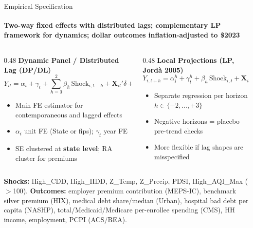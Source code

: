 \documentclass[aspectratio=169,11pt]{beamer}
\newcommand{\emphcolor}[1]{{\color{WarmOrange}\textbf{#1}}}
\newcommand{\tealtext}[1]{{\color{Teal}#1}}
\begin{document}
\begin{frame}[shrink=4]{Empirical Specification}
  \framesubtitle{Two-way fixed effects with distributed lags; complementary LP framework for dynamics; dollar outcomes inflation-adjusted to \$2023}
  \begin{columns}[T]
    \begin{column}{0.48\textwidth}
      \textbf{\tealtext{Dynamic Panel / Distributed Lag (DP/DL)}}\\[0.25em]
      \footnotesize
      \[
      Y_{it} = \alpha_i + \gamma_t + \sum_{h=0}^{2}\beta_h \, \text{Shock}_{i,t-h}
      + \mathbf{X}_{it}'\delta + \varepsilon_{it}
      \]
      \begin{itemize}\itemsep0.12em
        \item Main FE estimator for contemporaneous and lagged effects
        \item \(\alpha_i\) unit FE (State or fips); \(\gamma_t\) year FE
        \item SE clustered at \emphcolor{state level}; RA cluster for premiums
      \end{itemize}
    \end{column}
    \begin{column}{0.48\textwidth}
      \textbf{\tealtext{Local Projections (LP, Jord\`a 2005)}}\\[0.25em]
      \footnotesize
      \[
      Y_{i,t+h} = \alpha_i^h + \gamma_t^h + \beta_h \, \text{Shock}_{i,t}
      + \mathbf{X}_{it}'\delta_h + \varepsilon_{i,t+h}
      \]
      \begin{itemize}\itemsep0.12em
        \item Separate regression per horizon \(h \in \{-2,\ldots,+3\}\)
        \item Negative horizons = placebo pre-trend checks
        \item More flexible if lag shapes are misspecified
      \end{itemize}
    \end{column}
  \end{columns}
  \vspace{0.35em}
  \scriptsize
  \textbf{Shocks:} High\_CDD, High\_HDD, Z\_Temp, Z\_Precip, PDSI, High\_AQI\_Max (\(>\)100).
  \textbf{Outcomes:} employer premium contribution (MEPS-IC), benchmark silver premium (HIX), medical debt share/median (Urban), hospital bad debt per capita (NASHP), total/Medicaid/Medicare per-enrollee spending (CMS), HH income, employment, PCPI (ACS/BEA).
\end{frame}
\end{document}
